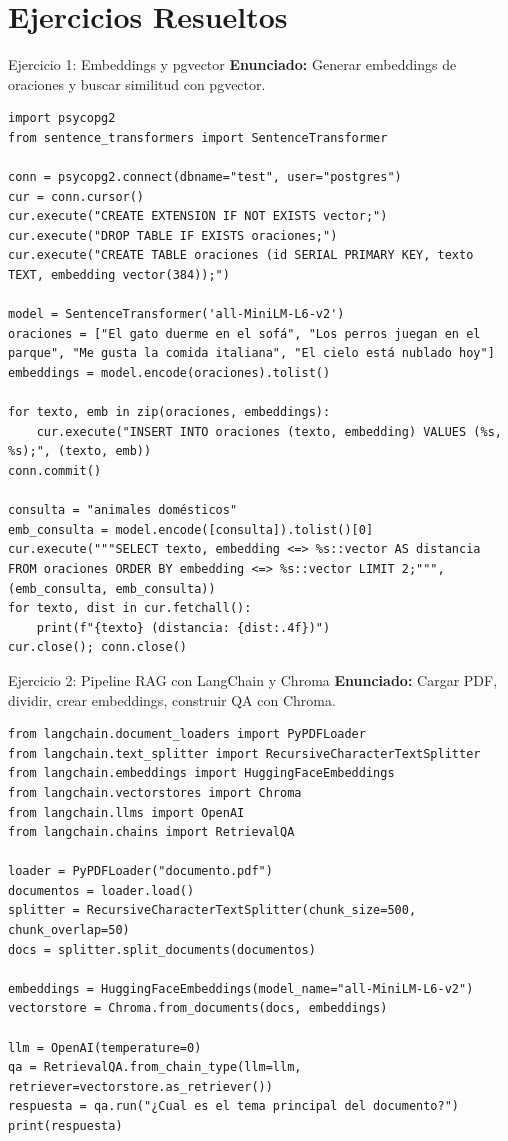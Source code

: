 \documentclass[aspectratio=169, 10pt, xcolor=table]{beamer}
\begin{document}
\section{Ejercicios Resueltos}

\begin{frame}[fragile]{Ejercicio 1: Embeddings y pgvector}
    \textbf{Enunciado:} Generar embeddings de oraciones y buscar similitud con pgvector.
    \begin{lstlisting}[style=python]
import psycopg2
from sentence_transformers import SentenceTransformer

conn = psycopg2.connect(dbname="test", user="postgres")
cur = conn.cursor()
cur.execute("CREATE EXTENSION IF NOT EXISTS vector;")
cur.execute("DROP TABLE IF EXISTS oraciones;")
cur.execute("CREATE TABLE oraciones (id SERIAL PRIMARY KEY, texto TEXT, embedding vector(384));")

model = SentenceTransformer('all-MiniLM-L6-v2')
oraciones = ["El gato duerme en el sofá", "Los perros juegan en el parque", "Me gusta la comida italiana", "El cielo está nublado hoy"]
embeddings = model.encode(oraciones).tolist()

for texto, emb in zip(oraciones, embeddings):
    cur.execute("INSERT INTO oraciones (texto, embedding) VALUES (%s, %s);", (texto, emb))
conn.commit()

consulta = "animales domésticos"
emb_consulta = model.encode([consulta]).tolist()[0]
cur.execute("""SELECT texto, embedding <=> %s::vector AS distancia FROM oraciones ORDER BY embedding <=> %s::vector LIMIT 2;""", (emb_consulta, emb_consulta))
for texto, dist in cur.fetchall():
    print(f"{texto} (distancia: {dist:.4f})")
cur.close(); conn.close()
    \end{lstlisting}
\end{frame}

\begin{frame}[fragile]{Ejercicio 2: Pipeline RAG con LangChain y Chroma}
    \textbf{Enunciado:} Cargar PDF, dividir, crear embeddings, construir QA con Chroma.
    \begin{lstlisting}[style=python]
from langchain.document_loaders import PyPDFLoader
from langchain.text_splitter import RecursiveCharacterTextSplitter
from langchain.embeddings import HuggingFaceEmbeddings
from langchain.vectorstores import Chroma
from langchain.llms import OpenAI
from langchain.chains import RetrievalQA

loader = PyPDFLoader("documento.pdf")
documentos = loader.load()
splitter = RecursiveCharacterTextSplitter(chunk_size=500, chunk_overlap=50)
docs = splitter.split_documents(documentos)

embeddings = HuggingFaceEmbeddings(model_name="all-MiniLM-L6-v2")
vectorstore = Chroma.from_documents(docs, embeddings)

llm = OpenAI(temperature=0)
qa = RetrievalQA.from_chain_type(llm=llm, retriever=vectorstore.as_retriever())
respuesta = qa.run("¿Cual es el tema principal del documento?")
print(respuesta)
    \end{lstlisting}
\end{frame}
\end{document}
